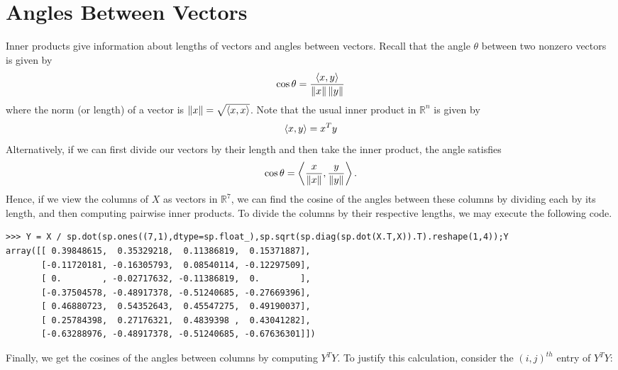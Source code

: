 \section*{Angles Between Vectors}

Inner products give information about lengths of vectors and angles between vectors.  Recall that the angle $\theta$ between two nonzero 
vectors is given by
\[
\cos{\theta} = \frac{\langle x,y \rangle}{\left\lVert x\right\rVert\left\lVert y\right\rVert}
\]
where the norm (or length) of a vector is $\left\lVert x\right\rVert = \sqrt{\langle x,x \rangle}$.  Note that the usual inner product in $\mathbb{R}^n$ is given by
\[
\langle x,y \rangle = x^T y
\]
Alternatively, if we can first divide our vectors by their length and then take the inner product, the angle satisfies
\[
\cos{\theta} = \left\langle\frac{x}{\left\lVert x\right\rVert},\frac{y}{\left\lVert y\right\rVert}\right\rangle.
\]
Hence, if we view the columns of $X$ as vectors in $\mathbb{R}^7$, we can find the cosine of the angles between these columns by dividing each 
by its length, and then computing pairwise inner products. To divide the columns by their respective lengths, we may execute the following 
code.
\begin{lstlisting}
>>> Y = X / sp.dot(sp.ones((7,1),dtype=sp.float_),sp.sqrt(sp.diag(sp.dot(X.T,X)).T).reshape(1,4));Y
array([[ 0.39848615,  0.35329218,  0.11386819,  0.15371887],
       [-0.11720181, -0.16305793,  0.08540114, -0.12297509],
       [ 0.        , -0.02717632, -0.11386819,  0.        ],
       [-0.37504578, -0.48917378, -0.51240685, -0.27669396],
       [ 0.46880723,  0.54352643,  0.45547275,  0.49190037],
       [ 0.25784398,  0.27176321,  0.4839398 ,  0.43041282],
       [-0.63288976, -0.48917378, -0.51240685, -0.67636301]])
\end{lstlisting}
Finally, we get the cosines of the angles between columns by computing $Y^T Y$. To justify this calculation, consider
the $(i,j)^{th}$ entry of $Y^T Y$:
